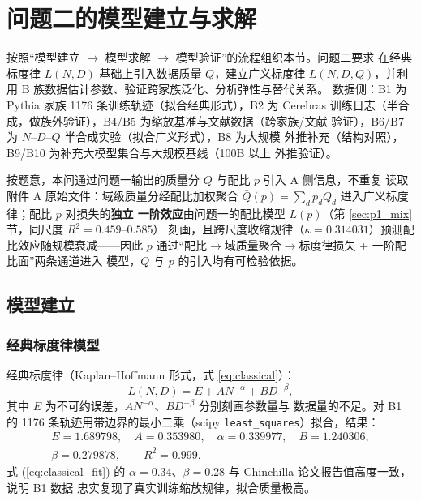 \section{问题二的模型建立与求解}

按照``模型建立 $\to$ 模型求解 $\to$ 模型验证''的流程组织本节。问题二要求
在经典标度律 $L(N,D)$ 基础上引入数据质量 $Q$，建立广义标度律
$L(N,D,Q)$，并利用 B 族数据估计参数、验证跨家族泛化、分析弹性与替代关系。
数据侧：B1 为 Pythia 家族 1176 条训练轨迹（拟合经典形式），B2 为 Cerebras
训练日志（半合成，做族外验证），B4/B5 为缩放基准与文献数据（跨家族/文献
验证），B6/B7 为 $N$--$D$--$Q$ 半合成实验（拟合广义形式），B8 为大规模
外推补充（结构对照），B9/B10 为补充大模型集合与大规模基线（100B 以上
外推验证）。

按题意，本问通过问题一输出的质量分 $Q$ 与配比 $p$ 引入 A 侧信息，不重复
读取附件 A 原始文件：域级质量分经配比加权聚合
$\bar{Q}(p)=\sum_{d}p_{d}Q_{d}$ 进入广义标度律；配比 $p$ 对损失的\textbf{独立
一阶效应}由问题一的配比模型 $L(p)$（第 \ref{sec:p1_mix} 节，同尺度 $R^2=0.459$--$0.585$）
刻画，且跨尺度收缩规律（$\kappa=0.314031$）预测配比效应随规模衰减——因此
$p$ 通过``配比$\to$域质量聚合$\to$标度律损失 + 一阶配比面''两条通道进入
模型，$Q$ 与 $p$ 的引入均有可检验依据。

\subsection{模型建立}

\subsubsection{经典标度律模型}

经典标度律（Kaplan\cite{refKaplan}--Hoffmann\cite{refHoffmann} 形式，式 \ref{eq:classical}）：
\begin{equation}
L(N,D)=E+A N^{-\alpha}+B D^{-\beta},
\label{eq:classical}
\end{equation}
其中 $E$ 为不可约误差，$A N^{-\alpha}$、$B D^{-\beta}$ 分别刻画参数量与
数据量的不足。对 B1 的 1176 条轨迹用带边界的最小二乘（scipy
\texttt{least\_squares}）拟合，结果：
\begin{align}
E=1.689798,\quad A=0.353980,\quad \alpha=0.339977,\quad B=1.240306,
\nonumber\\
\beta=0.279878,\qquad R^2=0.999.
\label{eq:classical_fit}
\end{align}
式 (\ref{eq:classical_fit}) 的 $\alpha=0.34$、$\beta=0.28$ 与 Chinchilla
论文报告值高度一致，说明 B1 数据
忠实复现了真实训练缩放规律，拟合质量极高。

